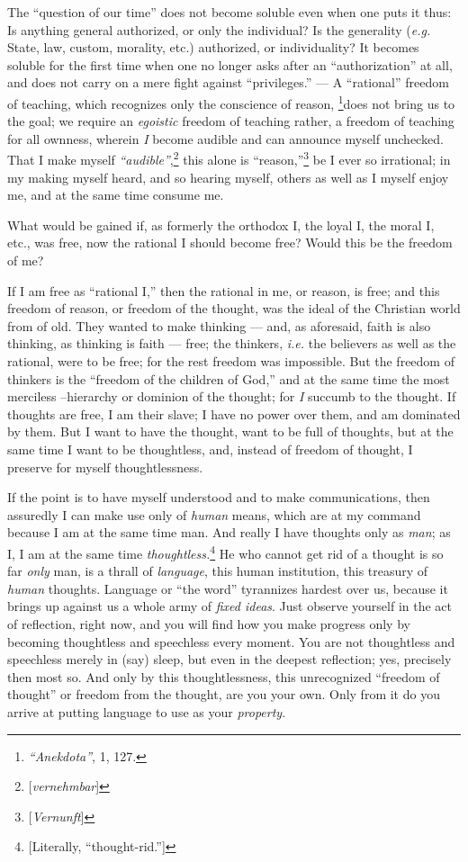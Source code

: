 The ``question of our time'' does not become soluble even when one puts it 
thus: Is anything general authorized, or only the individual? Is the 
generality (\textit{e.g.} State, law, custom, morality, etc.) authorized, or 
individuality? It becomes soluble for the first time when one no longer asks 
after an ``authorization'' at all, and does not carry on a mere fight 
against ``privileges.'' --- A ``rational'' freedom of teaching, which 
recognizes only the conscience of reason, \footnote{\textit{``Anekdota''}, 
1, 127. }does not bring us to the goal; we require an \textit{egoistic} 
freedom of teaching rather, a freedom of teaching for all ownness, wherein 
\textit{I} become audible and can announce myself unchecked. That I make 
myself \textit{``audible''},\footnote{[\textit{vernehmbar}]} this alone is 
``reason,''\footnote{[\textit{Vernunft}]} be I ever so irrational; in my 
making myself heard, and so hearing myself, others as well as I myself enjoy 
me, and at the same time consume me.

What would be gained if, as formerly the orthodox I, the loyal I, the moral I, 
etc., was free, now the rational I should become free? Would this be the 
freedom of me?

If I am free as ``rational I,'' then the rational in me, or reason, is free; 
and this freedom of reason, or freedom of the thought, was the ideal of the 
Christian world from of old. They wanted to make thinking --- and, as 
aforesaid, faith is also thinking, as thinking is faith --- free; the thinkers, 
\textit{i.e.} the believers as well as the rational, were to be free; for the 
rest freedom was impossible. But the freedom of thinkers is the ``freedom of 
the children of God,'' and at the same time the most merciless --hierarchy or 
dominion of the thought; for \textit{I} succumb to the thought. If thoughts 
are free, I am their slave; I have no power over them, and am dominated by 
them. But I want to have the thought, want to be full of thoughts, but at the 
same time I want to be thoughtless, and, instead of freedom of thought, I 
preserve for myself thoughtlessness.

If the point is to have myself understood and to make communications, then 
assuredly I can make use only of \textit{human} means, which are at my command 
because I am at the same time man. And really I have thoughts only as 
\textit{man}; as I, I am at the same time 
\textit{thoughtless.}\footnote{[Literally, ``thought-rid.'']} He who cannot 
get rid of a thought is so far \textit{only} man, is a thrall of 
\textit{language}, this human institution, this treasury of \textit{human} 
thoughts. Language or ``the word'' tyrannizes hardest over us, because it 
brings up against us a whole army of \textit{fixed ideas}. Just observe 
yourself in the act of reflection, right now, and you will find how you make 
progress only by becoming thoughtless and speechless every moment. You are not 
thoughtless and speechless merely in (say) sleep, but even in the deepest 
reflection; yes, precisely then most so. And only by this thoughtlessness, 
this unrecognized ``freedom of thought'' or freedom from the thought, are 
you your own. Only from it do you arrive at putting language to use as your 
\textit{property}.

